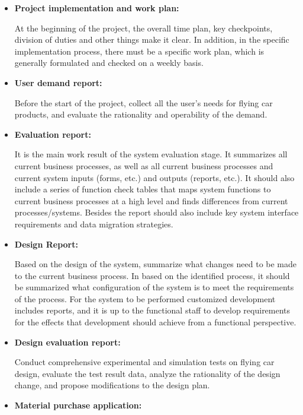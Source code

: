 \begin{itemize}

\item \textbf{Project implementation and work plan:}

At the beginning of the project, the overall time plan, key checkpoints, division of duties and other things make it clear. In addition, in the specific implementation process, there must be a specific work plan, which is generally formulated and checked on a weekly basis.

\item \textbf{User demand report:}

Before the start of the project, collect all the user's needs for flying car products, and evaluate the rationality and operability of the demand.

\item \textbf{Evaluation report:}

It is the main work result of the system evaluation stage. It summarizes all current business processes, as well as all current business processes and current system inputs (forms, etc.) and outputs (reports, etc.). It should also include a series of function check tables that maps system functions to current business processes at a high level and finds differences from current processes/systems. Besides the report should also include key system interface requirements and data migration strategies.

\item \textbf{Design Report:}

Based on the design of the system, summarize what changes need to be made to the current business process. In based on the identified process, it should be summarized what configuration of the system is to meet the requirements of the process. For the system to be performed customized development includes reports, and it is up to the functional staff to develop requirements for the effects that development should achieve from a functional perspective.

\item \textbf{Design evaluation report:}

Conduct comprehensive experimental and simulation tests on flying car design, evaluate the test result data, analyze the rationality of the design change, and propose modifications to the design plan.

\item \textbf{Material purchase application:}


\end{itemize}
